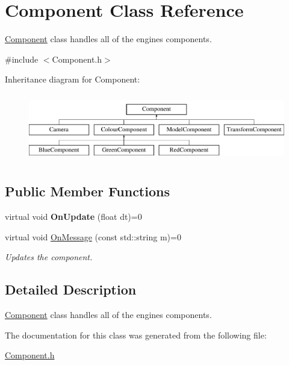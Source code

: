 \hypertarget{class_component}{}\section{Component Class Reference}
\label{class_component}


\mbox{\hyperlink{class_component}{Component}} class handles all of the engines components.  




{\ttfamily \#include $<$Component.\+h$>$}

Inheritance diagram for Component\+:\begin{figure}[H]
\begin{center}
\leavevmode
\includegraphics[height=3.000000cm]{class_component}
\end{center}
\end{figure}
\subsection*{Public Member Functions}
\begin{DoxyCompactItemize}
\item 
\mbox{\label{class_component_ab71d7f4b6d8792287a9b0c9e045acbe0}} 
virtual void {\bfseries On\+Update} (float dt)=0
\item 
\mbox{\label{class_component_a1a880fe5e212cd7ef8241e220660417d}} 
virtual void \mbox{\hyperlink{class_component_a1a880fe5e212cd7ef8241e220660417d}{On\+Message}} (const std\+::string m)=0
\begin{DoxyCompactList}\small\item\em Updates the component. \end{DoxyCompactList}\end{DoxyCompactItemize}


\subsection{Detailed Description}
\mbox{\hyperlink{class_component}{Component}} class handles all of the engines components. 

The documentation for this class was generated from the following file\+:\begin{DoxyCompactItemize}
\item 
\mbox{\hyperlink{_component_8h}{Component.\+h}}\end{DoxyCompactItemize}
